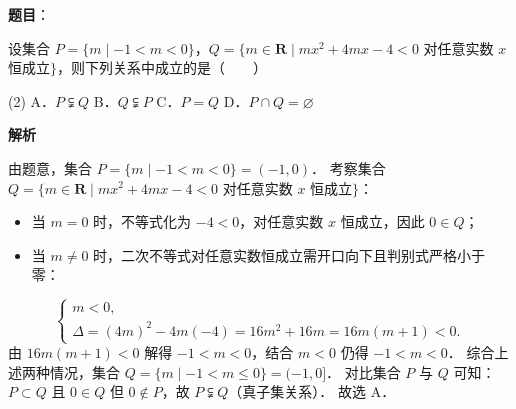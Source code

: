 \begin{answer}

\textbf{题目}：

设集合 $P = \{m \mid -1 < m < 0\}$，$Q = \{m \in \mathbf{R} \mid mx^2 + 4mx - 4 < 0$ 对任意实数 $x$ 恒成立$\}$，则下列关系中成立的是\mbox{（　　）}

\begin{gkopts}(2)
\task A．$P \subsetneqq Q$
\task B．$Q \subsetneqq P$
\task C．$P = Q$
\task D．$P \cap Q = \varnothing$
\end{gkopts}

\textbf{解析}

由题意，集合 $P = \{m \mid -1 < m < 0\} = (-1, 0)$．
考察集合 $Q = \{m \in \mathbf{R} \mid mx^2 + 4mx - 4 < 0$ 对任意实数 $x$ 恒成立$\}$：
\begin{itemize}
\item 当 $m = 0$ 时，不等式化为 $-4 < 0$，对任意实数 $x$ 恒成立，因此 $0 \in Q$；
\item 当 $m \neq 0$ 时，二次不等式对任意实数恒成立需开口向下且判别式严格小于零：
\end{itemize}
\nopagebreak[4]
\[
\begin{cases}
m < 0, \\
\Delta = (4m)^2 - 4m(-4) = 16m^2 + 16m = 16m(m + 1) < 0.
\end{cases}
\]
  由 $16m(m + 1) < 0$ 解得 $-1 < m < 0$，结合 $m < 0$ 仍得 $-1 < m < 0$．
综合上述两种情况，集合 $Q = \{m \mid -1 < m \leqslant 0\} = (-1, 0]$．
对比集合 $P$ 与 $Q$ 可知：$P \subset Q$ 且 $0 \in Q$ 但 $0 \notin P$，故 $P \subsetneqq Q$（真子集关系）．
故选 A．


\end{answer}
